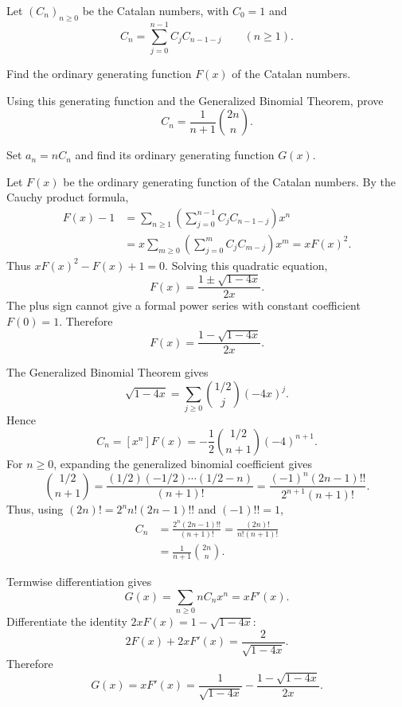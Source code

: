 \documentclass[11pt, oneside]{article}
\begin{document}
\begin{problem}
Let $(C_n)_{n\ge0}$ be the Catalan numbers, with $C_0=1$ and
\[
C_n=\sum_{j=0}^{n-1}C_jC_{n-1-j}\qquad(n\ge1).
\]
\begin{problemsubparts}
\item Find the ordinary generating function $F(x)$ of the Catalan numbers.
\item Using this generating function and the Generalized Binomial Theorem, prove
\[
C_n=\frac{1}{n+1}\binom{2n}{n}.
\]
\item Set $a_n=nC_n$ and find its ordinary generating function $G(x)$.
\end{problemsubparts}
\end{problem}
\begin{solution}
\begin{problemsubparts}
\item Let $F(x)$ be the ordinary generating function of the Catalan numbers.
By the Cauchy product formula,
\[
\begin{aligned}
F(x)-1
&=\sum_{n\ge1}\left(\sum_{j=0}^{n-1}C_jC_{n-1-j}\right)x^n\\
&=x\sum_{m\ge0}\left(\sum_{j=0}^{m}C_jC_{m-j}\right)x^m
=xF(x)^2.
\end{aligned}
\]
Thus $xF(x)^2-F(x)+1=0$. Solving this quadratic equation,
\[
F(x)=\frac{1\pm\sqrt{1-4x}}{2x}.
\]
The plus sign cannot give a formal power series with constant
coefficient $F(0)=1$. Therefore
\[
\boxed{F(x)=\frac{1-\sqrt{1-4x}}{2x}.}
\]
\item The Generalized Binomial Theorem gives
\[
\sqrt{1-4x}=\sum_{j\ge0}\binom{1/2}{j}(-4x)^j.
\]
Hence
\[
C_n=[x^n]F(x)
=-\frac12\binom{1/2}{n+1}(-4)^{n+1}.
\]
For $n\ge0$, expanding the generalized binomial coefficient gives
\[
\binom{1/2}{n+1}
=\frac{(1/2)(-1/2)\cdots(1/2-n)}{(n+1)!}
=\frac{(-1)^n(2n-1)!!}{2^{n+1}(n+1)!}.
\]
Thus, using $(2n)!=2^nn!(2n-1)!!$ and $(-1)!!=1$,
\[
\begin{aligned}
C_n
&=\frac{2^n(2n-1)!!}{(n+1)!}
=\frac{(2n)!}{n!(n+1)!}\\
&=\boxed{\frac1{n+1}\binom{2n}{n}}.
\end{aligned}
\]
\item Termwise differentiation gives
\[
G(x)=\sum_{n\ge0}nC_nx^n=xF'(x).
\]
Differentiate the identity $2xF(x)=1-\sqrt{1-4x}$:
\[
2F(x)+2xF'(x)=\frac{2}{\sqrt{1-4x}}.
\]
Therefore
\[
G(x)=xF'(x)=\boxed{\frac1{\sqrt{1-4x}}
-\frac{1-\sqrt{1-4x}}{2x}}.
\]
\end{problemsubparts}
\end{solution}
\end{document}

